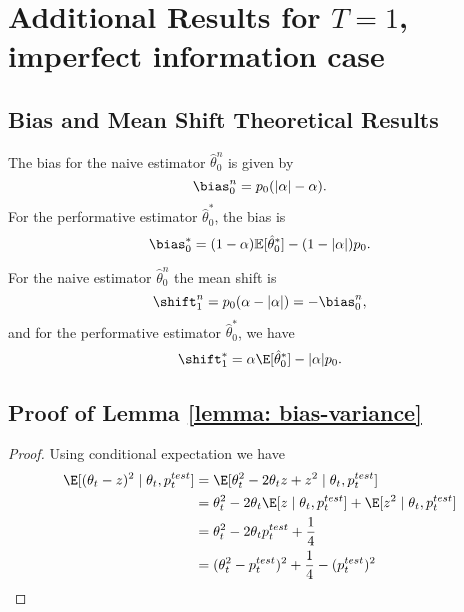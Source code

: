 \section{Additional Results for $T=1$, imperfect information case}
\label{sec: appendix2}
\subsection{Bias and Mean Shift Theoretical Results}
The bias for the naive estimator $\hat{\theta}_0^n$ is given by
\begin{equation*}
	\bias_0^n = p_0(|\alpha| - \alpha).
\end{equation*}
For the performative estimator $\hat{\theta}_0^\ast$, the bias is 
\begin{equation*}
	\bias_0^\ast= (1 - \alpha) \mathbb{E}[\hat{\theta}_0^\ast] - (1 - |\alpha|) p_0.
\end{equation*}

For the naive estimator $\hat{\theta}_0^n$ the mean shift is  
\begin{equation*}
	\shift_1^n = p_0(\alpha - |\alpha|) = - \bias_0^n,
\end{equation*}
and for the performative estimator $\hat{\theta}_0^\ast$, we have
\begin{equation*}
\shift_1^\ast = \alpha \E[\hat{\theta}_0^\ast] - |\alpha|p_0.
\end{equation*}

\subsection{Proof of Lemma \ref{lemma: bias-variance}}
\begin{proof}
Using conditional expectation we have
\begin{align*}
\E[(\theta_t - z)^2 \mid \theta_t, p_t^{test}] &= \E[\theta_t^2 - 2 \theta_t  z + z^2 \mid  \theta_t, p_t^{test}]\\
&= \theta_t^2 - 2 \theta_t \E[z \mid \theta_t, p_t^{test}] + \E[z^2 \mid \theta_t, p_t^{test}]\\	
&= \theta_t^2 - 2 \theta_t p_t^{test} + \frac14\\
&= (\theta_t^2 - p_t^{test})^2 + \frac14 - (p_t^{test})^2
\end{align*}
\end{proof}

